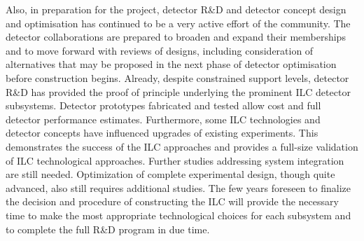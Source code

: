 \documentclass[%
 reprint,
 amsmath,amssymb,
 aps,
]{revtex4-1}
\newcommand{\todo}[1]{\textcolor{red}{{#1}}}
\begin{document}
Also, in preparation for the project, detector R\&D and detector concept design and optimisation has continued to be a very active
effort of the community.  The detector collaborations are prepared to broaden and expand their memberships and to move forward
with reviews of designs, including consideration of alternatives that may be proposed in the next phase of detector optimisation before construction begins. Already, despite constrained support levels, detector R\&D has provided the proof of principle underlying the prominent ILC detector subsystems. Detector prototypes fabricated and tested allow cost and full detector performance estimates. Furthermore, some ILC technologies and detector concepts have influenced upgrades of existing experiments.
This demonstrates the success of the ILC approaches and  provides a full-size validation of ILC technological approaches. Further studies addressing system integration are still needed. Optimization of complete experimental design, though quite advanced, also still requires additional studies. The few years foreseen to finalize the decision and procedure of constructing the ILC will provide the necessary time to make the most appropriate technological choices for each subsystem and to complete the full R\&D program in due time.

\end{document}
